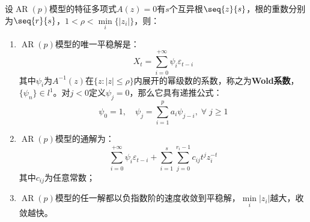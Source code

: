 \begin{theorem}\label{theo:ARPSolution}
	设$\operatorname{AR}(p)$模型的特征多项式$A(z)=0$有$s$个互异根$\seq{z}{s}$，根的重数分别为$\seq{r}{s}$，$1<\rho<\min\limits_i\{|z_i|\}$，则：
	\begin{enumerate}
		\item $\operatorname{AR}(p)$模型的唯一平稳解是：
		\begin{equation*}
			X_t=\sum_{i=0}^{+\infty}\psi_i\varepsilon_{t-i}
		\end{equation*}
		其中$\psi_i$为$A^{-1}(z)$在$\{z:|z|\leqslant\rho\}$内展开的幂级数的系数，称之为\textbf{Wold系数}，$\{\psi_n\}\in l^1$。对$j<0$定义$\psi_j=0$，那么它具有递推公式：
		\begin{equation*}
			\psi_0=1,\quad\psi_j=\sum_{i=1}^{p}a_i\psi_{j-i},\;\forall\;j\geqslant1
		\end{equation*}
		\item $\operatorname{AR}(p)$模型的通解为：
		\begin{equation*}
			\sum_{i=0}^{+\infty}\psi_i\varepsilon_{t-i}+\sum_{i=1}^{s}\sum_{j=0}^{r_i-1}c_{ij}t^{j}z_i^{-t}
		\end{equation*}
		其中$c_{ij}$为任意常数；
		\item $\operatorname{AR}(p)$模型的任一解都以负指数阶的速度收敛到平稳解，$\min\limits_i{|z_i|}$越大，收敛越快。
	\end{enumerate}
\end{theorem}
